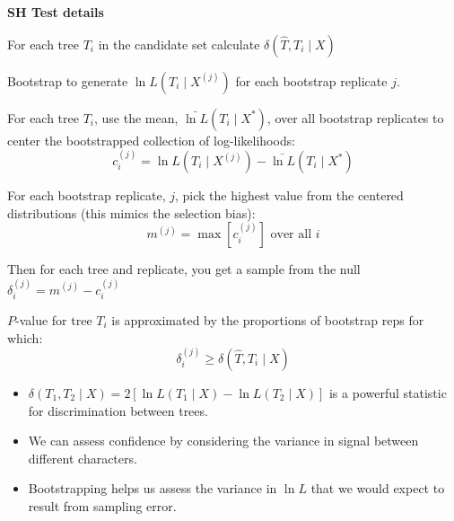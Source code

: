 \myNewSlide
{\bf SH Test details}
\normalsize
\begin{compactitem}
    \item For each tree $T_i$ in the candidate set calculate $\delta(\hat{T}, T_i \mid X)$
    \item Bootstrap to generate ${\ln L}(T_i \mid X^{(j)})$ for each bootstrap replicate $j$.
    \item For each tree $T_i$, use the mean, $\bar{\ln L}(T_i \mid X^{\ast})$, over all bootstrap replicates to center the bootstrapped collection of log-likelihoods:
        $$c_i^{(j)} = {\ln L}(T_i \mid X^{(j)})-\bar{\ln L}(T_i \mid X^{\ast})$$
    \item For each bootstrap replicate, $j$, pick the highest value from the centered distributions (this mimics the selection bias): $$m^{(j)} = \max\left[c_i^{(j)}\right] \mbox{ over all } i$$
    \item Then for each tree and replicate, you get a sample from the null $\delta_i^{(j)} = m^{(j)} - c_i^{(j)}$
    \item $P$-value for tree $T_i$ is approximated by the proportions of bootstrap reps for which: $$\delta_i^{(j)} \geq \delta(\hat{T}, T_i \mid X)$$
\end{compactitem}



\begin{itemize}
    \item $\delta(T_1,T_2 \mid X) = 2\left[\ln L(T_1 \mid X) - \ln L(T_2 \mid X)\right]$ is a powerful statistic for discrimination between trees.
    \item We can assess confidence by considering the variance in signal between different characters.
    \item Bootstrapping helps us assess the variance in $\ln L$ that we would expect to result from sampling error.
\end{itemize}

\myNewSlide
